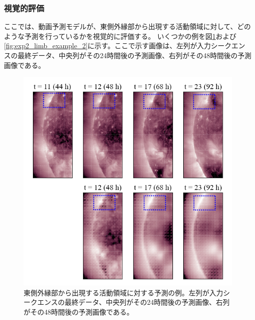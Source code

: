       \subsubsection{視覚的評価}
        ここでは、動画予測モデルが、東側外縁部から出現する活動領域に対して、どのような予測を行っているかを視覚的に評価する。
        いくつかの例を図\ref{fig:exp1_limb_example_1}および\ref{fig:exp2_limb_example_2}に示す。ここで示す画像は、左列が入力シークエンスの最終データ、中央列がその24時間後の予測画像、右列がその48時間後の予測画像である。
        \begin{figure}[htbp]
          \centering
          \includegraphics[width=\textwidth]{figures/exp2/limb_sample_3_caption.jpg}
          \caption{東側外縁部から出現する活動領域に対する予測の例。左列が入力シークエンスの最終データ、中央列がその24時間後の予測画像、右列がその48時間後の予測画像である。}
          \label{fig:exp1_limb_example_1}
        \end{figure}
